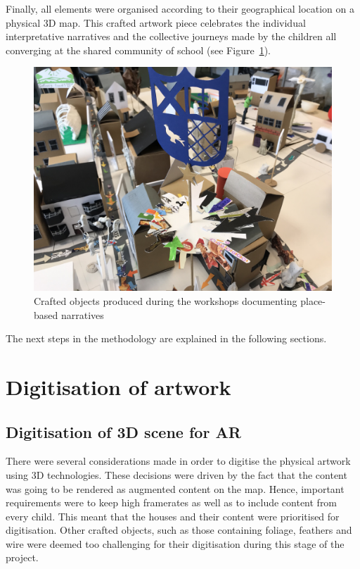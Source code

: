 \documentclass[acmlarge,screen,dvipsnames]{acmart}
\begin{document}
Finally, all elements were organised according to their geographical location
on a physical 3D map. This crafted artwork piece celebrates the individual
interpretative narratives and the collective journeys made by the children all
converging at the shared community of school (see Figure~\ref{fig:artwork}). 

\begin{figure}[ht] \centering
\includegraphics[width=\linewidth]{images/variousassets.jpg}
\caption{Crafted objects produced during the workshops documenting place-based
narratives} \label{fig:artwork} \end{figure}

The next steps in the methodology are explained in the following sections.

\section{Digitisation of artwork} 
\label{dig} 

\subsection{Digitisation of 3D scene for AR} There were several considerations
made in order to digitise the physical artwork using 3D technologies. These
decisions were driven by the fact that the content was going to be rendered as
augmented content on the map. Hence, important requirements were to keep high
framerates as well as to include content from every child. This meant that the
houses and their content were prioritised for digitisation. Other crafted objects, 
such as those containing foliage, feathers and wire were deemed too challenging 
for their digitisation during this stage of the project.
\end{document}

